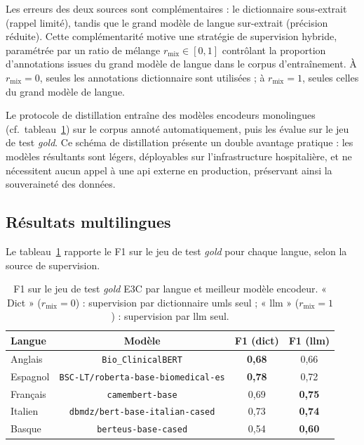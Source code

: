 Les erreurs des deux sources sont complémentaires : le dictionnaire sous-extrait (rappel limité), tandis que le grand modèle de langue sur-extrait (précision réduite).
Cette complémentarité motive une stratégie de supervision hybride, paramétrée par un ratio de mélange $r_{\text{mix}} \in [0,1]$ contrôlant la proportion d'annotations issues du grand modèle de langue dans le corpus d'entraînement.
À $r_{\text{mix}} = 0$, seules les annotations dictionnaire sont utilisées ; à $r_{\text{mix}} = 1$, seules celles du grand modèle de langue.

Le protocole de distillation entraîne des modèles encodeurs monolingues (cf.\ tableau~\ref{tab:weak-results}) sur le corpus annoté automatiquement, puis les évalue sur le jeu de test \emph{gold}.
Ce schéma de distillation présente un double avantage pratique : les modèles résultants sont légers, déployables sur l'infrastructure hospitalière, et ne nécessitent aucun appel à une \gls{api} externe en production, préservant ainsi la souveraineté des données.

\subsection{Résultats multilingues}

Le tableau~\ref{tab:weak-results} rapporte le F1 sur le jeu de test \emph{gold} pour chaque langue, selon la source de supervision.

\begin{table}[htbp]
\centering
\small
\begin{tabular}{lccc}
\toprule
\textbf{Langue} & \textbf{Modèle} & \textbf{F1 (dict)} & \textbf{F1 (\gls{llm})} \\
\midrule
Anglais  & \verb|Bio_ClinicalBERT|     & \textbf{0,68} & 0,66 \\
Espagnol & \verb|BSC-LT/roberta-base-biomedical-es|  & \textbf{0,78} & 0,72 \\
Français & \verb|camembert-base|             & 0,69 & \textbf{0,75} \\
Italien  & \verb|dbmdz/bert-base-italian-cased|                 & 0,73 & \textbf{0,74} \\
Basque   & \verb|berteus-base-cased|               & 0,54 & \textbf{0,60} \\
\bottomrule
\end{tabular}
\caption{F1 sur le jeu de test \emph{gold} E3C par langue et meilleur modèle encodeur. « Dict » ($r_{\text{mix}} = 0$) : supervision par dictionnaire \gls{umls} seul ; « \gls{llm} » ($r_{\text{mix}} = 1$) : supervision par \gls{llm} seul.}
\label{tab:weak-results}
\end{table}

